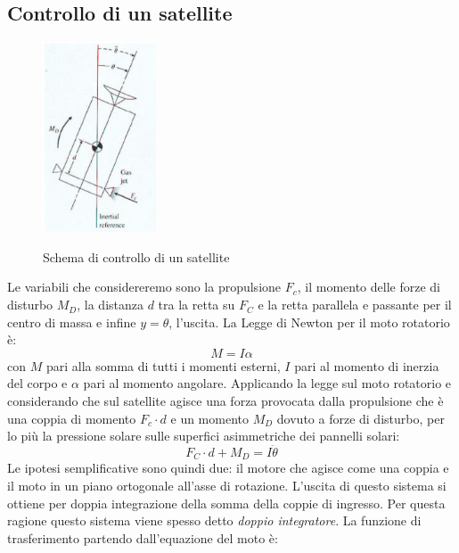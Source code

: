 \documentclass[a4paper]{report}
\begin{document}
\subsection{Controllo di un satellite}
\begin{figure}[!h]
  \centering
  \includegraphics[width=0.3\textwidth]{./images/satellite.png}
  \label{fig:satellite}
  \caption{Schema di controllo di un satellite\label{fig:satellite}}
\end{figure}

Le variabili che considereremo sono la propulsione $F_c$, il momento
delle forze di disturbo $M_D$, la distanza $d$ tra la retta su $F_C$ e
la retta parallela e passante per il centro di massa e infine $y =
\theta$, l'uscita.
La Legge di Newton per il moto
rotatorio\label{leggedinewtonmotorotatorio} \`e:
$$M = I \alpha$$
con $M$ pari alla somma di tutti i momenti esterni, $I$ pari al
momento di inerzia del corpo e $\alpha$ pari al momento angolare.
Applicando la legge sul moto rotatorio e considerando
che sul satellite agisce una forza provocata dalla propulsione che \`e
una coppia di momento $F_c \cdot d$ e un momento $M_D$ dovuto a forze
di disturbo, per lo pi\`u la pressione solare sulle superfici
asimmetriche dei pannelli solari:
$$F_C \cdot d + M_D = I \ddot{\theta}$$
Le ipotesi semplificative sono quindi due: il motore che agisce come
una coppia e il moto in un piano ortogonale all'asse di
rotazione. L'uscita di questo sistema si ottiene per doppia
integrazione della somma della coppie di ingresso. Per questa ragione
questo sistema viene spesso detto {\em doppio
  integratore}. La funzione di trasferimento
partendo dall'equazione del moto \`e:
\end{document}
